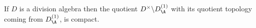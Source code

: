 \begin{theorem}
  \label{NumberField.AdeleRing.DivisionAlgebra.compact_quotient}
  \leanok
  If $D$ is a division algebra then
  the quotient $D^\times\backslash D_{\A}^{(1)}$
  with its quotient topology coming from $D_{\A}^{(1)}$, is compact.
\end{theorem}
